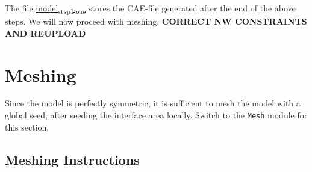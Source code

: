 \documentclass[11pt]{article}
\begin{document}
The file \href{https://github.com/Nidish96/Abaqus4Joints/blob/main/assets/assembly/model\_step1.cae}{model\textsubscript{step1.cae}} stores the CAE-file generated after the end of the above steps.
We will now proceed with meshing.
\textbf{CORRECT NW CONSTRAINTS AND REUPLOAD}
\section{Meshing}
\label{sec:org47ee239}
Since the model is perfectly symmetric, it is sufficient to mesh the model with a global seed, after seeding the interface area locally.
Switch to the \texttt{Mesh} module for this section.
\subsection{Meshing Instructions}
\label{sec:org5d5d15e}
\end{document}
